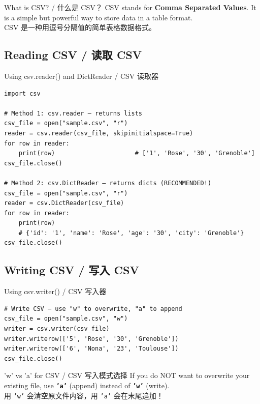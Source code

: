 \documentclass[11pt,a4paper]{report}
\let\oldtexttt\texttt
\renewcommand{\texttt}[1]{\textcolor{mainblue}{\oldtexttt{#1}}}
\begin{document}
\begin{concept}{What is CSV? / 什么是 CSV？}
    CSV stands for \textbf{Comma Separated Values}. It is a simple but powerful way to store data in a table format. \\
    CSV 是一种用逗号分隔值的简单表格数据格式。
\end{concept}

\subsection{Reading CSV / 读取 CSV}

\begin{examplebox}{Using csv.reader() and DictReader / CSV 读取器}
\begin{lstlisting}
import csv

# Method 1: csv.reader — returns lists
csv_file = open("sample.csv", "r")
reader = csv.reader(csv_file, skipinitialspace=True)
for row in reader:
    print(row)                      # ['1', 'Rose', '30', 'Grenoble']
csv_file.close()

# Method 2: csv.DictReader — returns dicts (RECOMMENDED!)
csv_file = open("sample.csv", "r")
reader = csv.DictReader(csv_file)
for row in reader:
    print(row)
    # {'id': '1', 'name': 'Rose', 'age': '30', 'city': 'Grenoble'}
csv_file.close()
\end{lstlisting}
\end{examplebox}

\subsection{Writing CSV / 写入 CSV}

\begin{examplebox}{Using csv.writer() / CSV 写入器}
\begin{lstlisting}
# Write CSV — use "w" to overwrite, "a" to append
csv_file = open("sample.csv", "w")
writer = csv.writer(csv_file)
writer.writerow(['5', 'Rose', '30', 'Grenoble'])
writer.writerow(['6', 'Nona', '23', 'Toulouse'])
csv_file.close()
\end{lstlisting}
\end{examplebox}

\begin{warning}{'w' vs 'a' for CSV / CSV 写入模式选择}
    If you do NOT want to overwrite your existing file, use \textbf{\texttt{'a'}} (append) instead of \textbf{\texttt{'w'}} (write). \\
    用 \texttt{'w'} 会清空原文件内容，用 \texttt{'a'} 会在末尾追加！
\end{warning}
\end{document}
